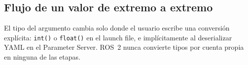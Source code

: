 \subsection{Flujo de un valor de extremo a extremo}

El tipo del argumento cambia solo donde el usuario escribe una conversión explícita: \texttt{int()} o \texttt{float()} en el launch file, e implícitamente al deserializar YAML en el Parameter Server. ROS~2 nunca convierte tipos por cuenta propia en ninguna de las etapas.
